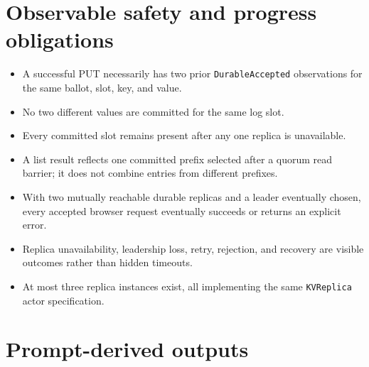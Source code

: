 \hypertarget{observable-safety-and-progress-obligations}{%
\section{Observable safety and progress
obligations}\label{observable-safety-and-progress-obligations}}

\begin{itemize}
\tightlist
\item
  A successful PUT necessarily has two prior \texttt{DurableAccepted}
  observations for the same ballot, slot, key, and value.
\item
  No two different values are committed for the same log slot.
\item
  Every committed slot remains present after any one replica is
  unavailable.
\item
  A list result reflects one committed prefix selected after a quorum
  read barrier; it does not combine entries from different prefixes.
\item
  With two mutually reachable durable replicas and a leader eventually
  chosen, every accepted browser request eventually succeeds or returns
  an explicit error.
\item
  Replica unavailability, leadership loss, retry, rejection, and
  recovery are visible outcomes rather than hidden timeouts.
\item
  At most three replica instances exist, all implementing the same
  \texttt{KVReplica} actor specification.
\end{itemize}

\hypertarget{prompt-derived-outputs}{%
\section{Prompt-derived outputs}\label{prompt-derived-outputs}}

